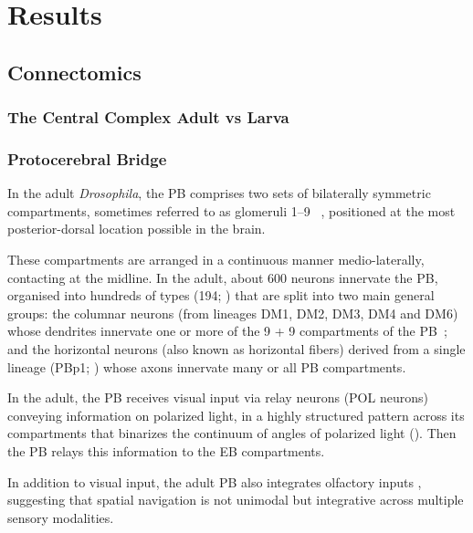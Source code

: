 \chapter{Results}
\section{Connectomics}
\subsection{The Central Complex Adult vs Larva}

\subsection*{Protocerebral Bridge}
In the adult \textit{Drosophila}, the PB comprises two sets of bilaterally symmetric compartments, sometimes referred to as glomeruli 1–9 ~\cite{hulse2021connectome}, positioned at the most posterior-dorsal location possible in the brain.

These compartments are arranged in a continuous manner medio-laterally, contacting at the midline.
In the adult, about 600 neurons innervate the PB, organised into hundreds of types (194; \citep{wolff2015neuroarchitecture}) that are split into two main general groups: the columnar neurons (from lineages DM1, DM2, DM3, DM4 and DM6) whose dendrites innervate one or more of the 9 + 9 compartments of the PB~\citep{wolff2015neuroarchitecture}; and the horizontal neurons (also known as horizontal fibers) derived from a single lineage (PBp1; \citep{andrade2019developmentally}) whose axons innervate many or all PB compartments.

In the adult, the PB receives visual input via relay neurons (POL neurons) conveying information on polarized light, in a highly structured pattern across its compartments that binarizes the continuum of angles of polarized light (\citep{heinze2009transformation}). Then the PB relays this information to the EB compartments.

In addition to visual input, the adult PB also integrates olfactory inputs \citep{hulse2021connectome}, suggesting that spatial navigation is not unimodal but integrative across multiple sensory modalities.

